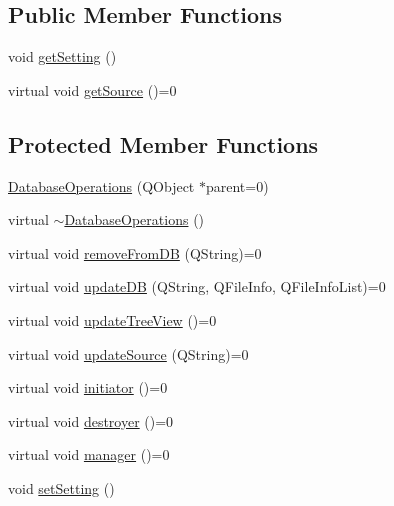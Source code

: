 \subsection*{Public Member Functions}
\begin{DoxyCompactItemize}
\item 
void \hyperlink{class_database_operations_a7fb19eb6129268920bc655321703fa0d}{get\-Setting} ()
\item 
virtual void \hyperlink{class_database_operations_a8cf9e78c2927df5cc0a886992d394fdd}{get\-Source} ()=0
\end{DoxyCompactItemize}
\subsection*{Protected Member Functions}
\begin{DoxyCompactItemize}
\item 
\hyperlink{class_database_operations_a843d8a6cc96a346a1ab4943362a9ba0c}{Database\-Operations} (Q\-Object $\ast$parent=0)
\item 
virtual \hyperlink{class_database_operations_a512890dc178ab17b5d54592fbba0eabd}{$\sim$\-Database\-Operations} ()
\item 
virtual void \hyperlink{class_database_operations_abab54bc65a349871c58d6027d871786e}{remove\-From\-D\-B} (Q\-String)=0
\item 
virtual void \hyperlink{class_database_operations_afe6635240b49bdeb4a1cee1b948da5fd}{update\-D\-B} (Q\-String, Q\-File\-Info, Q\-File\-Info\-List)=0
\item 
virtual void \hyperlink{class_database_operations_a77a4a371cfb8fdc2fc0cbf0f954693cd}{update\-Tree\-View} ()=0
\item 
virtual void \hyperlink{class_database_operations_a78b632e484e7d469f02366dbd9e1cd91}{update\-Source} (Q\-String)=0
\item 
virtual void \hyperlink{class_database_operations_af399d5ee2e6c559cf98c3ca6559f96e5}{initiator} ()=0
\item 
virtual void \hyperlink{class_database_operations_a435467e14c7ebdf3ecc6359e57c4d013}{destroyer} ()=0
\item 
virtual void \hyperlink{class_database_operations_aeacfe0c761bf321b7a0c45763a16b4cf}{manager} ()=0
\item 
void \hyperlink{class_database_operations_a2d74da811fa9cb8f0239bfea76ccb9d4}{set\-Setting} ()
\end{DoxyCompactItemize}

